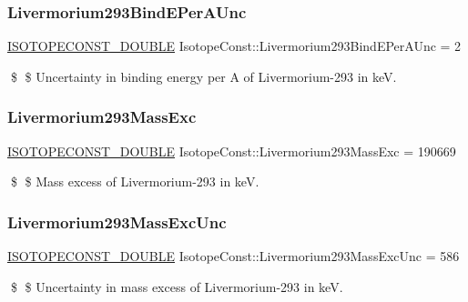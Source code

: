 \subsubsection{\texorpdfstring{Livermorium293\+Bind\+E\+Per\+A\+Unc}{Livermorium293BindEPerAUnc}}
{\footnotesize\ttfamily \mbox{\hyperlink{group___isotope_const-_macros_ga8f45a7272ce02c0b4c65c44636ed719a}{I\+S\+O\+T\+O\+P\+E\+C\+O\+N\+S\+T\+\_\+\+D\+O\+U\+B\+LE}} Isotope\+Const\+::\+Livermorium293\+Bind\+E\+Per\+A\+Unc = 2}

\$ \$ Uncertainty in binding energy per A of Livermorium-\/293 in keV. \mbox{\label{group___isotope_const-_livermorium-_lv293_ga8411332948fe8414f4a586f3546fdf1f}} 
\subsubsection{\texorpdfstring{Livermorium293\+Mass\+Exc}{Livermorium293MassExc}}
{\footnotesize\ttfamily \mbox{\hyperlink{group___isotope_const-_macros_ga8f45a7272ce02c0b4c65c44636ed719a}{I\+S\+O\+T\+O\+P\+E\+C\+O\+N\+S\+T\+\_\+\+D\+O\+U\+B\+LE}} Isotope\+Const\+::\+Livermorium293\+Mass\+Exc = 190669}

\$ \$ Mass excess of Livermorium-\/293 in keV. \mbox{\label{group___isotope_const-_livermorium-_lv293_ga114a5d4b08a2ea54cc5c061557045ce0}} 
\subsubsection{\texorpdfstring{Livermorium293\+Mass\+Exc\+Unc}{Livermorium293MassExcUnc}}
{\footnotesize\ttfamily \mbox{\hyperlink{group___isotope_const-_macros_ga8f45a7272ce02c0b4c65c44636ed719a}{I\+S\+O\+T\+O\+P\+E\+C\+O\+N\+S\+T\+\_\+\+D\+O\+U\+B\+LE}} Isotope\+Const\+::\+Livermorium293\+Mass\+Exc\+Unc = 586}

\$ \$ Uncertainty in mass excess of Livermorium-\/293 in keV. \mbox{\label{group___isotope_const-_livermorium-_lv293_ga5e347f39a67c7ce07ca8943988ee7a28}} 
